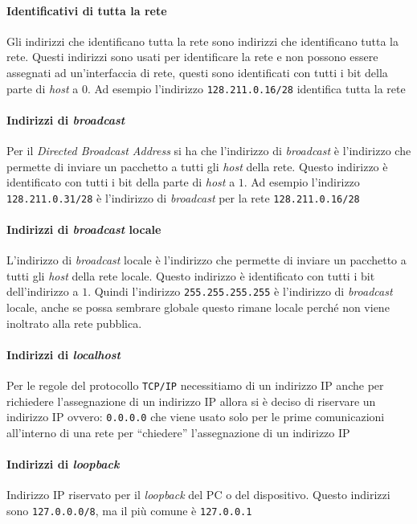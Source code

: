             \paragraph{Identificativi di tutta la rete} Gli indirizzi che identificano tutta la rete sono indirizzi che identificano tutta la rete. Questi indirizzi sono usati per identificare la rete e non possono essere assegnati ad un'interfaccia di rete, questi sono identificati con tutti i bit della parte di \textit{host} a $0$. Ad esempio l'indirizzo \texttt{128.211.0.16/28} identifica tutta la rete
            \paragraph{Indirizzi di \textit{broadcast}} Per il \textit{Directed Broadcast Address} si ha che l'indirizzo di \textit{broadcast} è l'indirizzo che permette di inviare un pacchetto a tutti gli \textit{host} della rete. Questo indirizzo è identificato con tutti i bit della parte di \textit{host} a $1$. Ad esempio l'indirizzo \texttt{128.211.0.31/28} è l'indirizzo di \textit{broadcast} per la rete \texttt{128.211.0.16/28}
            \paragraph{Indirizzi di \textit{broadcast} locale} L'indirizzo di \textit{broadcast} locale è l'indirizzo che permette di inviare un pacchetto a tutti gli \textit{host} della rete locale. Questo indirizzo è identificato con tutti i bit dell'indirizzo a $1$. Quindi l'indirizzo \texttt{255.255.255.255} è l'indirizzo di \textit{broadcast} locale, anche se possa sembrare globale questo rimane locale perché non viene inoltrato alla rete pubblica.
            \paragraph{Indirizzi di \textit{localhost}} Per le regole del protocollo \texttt{TCP/IP} necessitiamo di un indirizzo \Acrshort*{IP} anche per richiedere l'assegnazione di un indirizzo \Acrshort*{IP} allora si è deciso di riservare un indirizzo \Acrshort*{IP} ovvero: \texttt{0.0.0.0} che viene usato solo per le prime comunicazioni all'interno di una rete per ``chiedere'' l'assegnazione di un indirizzo \Acrshort*{IP}
            \paragraph{Indirizzi di \textit{loopback}} Indirizzo \Acrshort*{IP} riservato per il \textit{loopback} del PC o del dispositivo. Questo indirizzi sono \texttt{127.0.0.0/8}, ma il più comune è \texttt{127.0.0.1}
